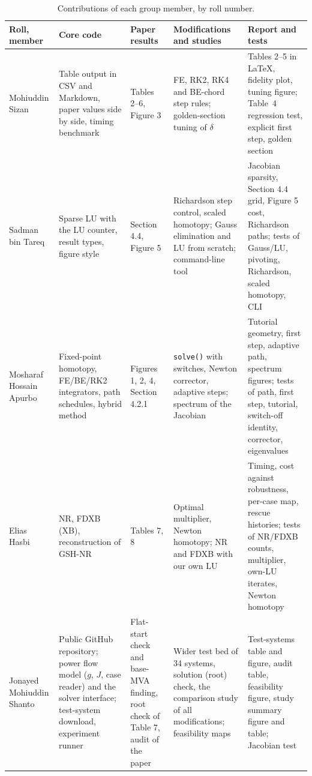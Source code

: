 \documentclass[sigconf,nonacm]{acmart}
\newcommand{\thead}[1]{\textbf{#1}}
\newcommand{\code}[1]{\texttt{#1}}
\begin{document}
\begin{table}[!htbp]
\centering
\caption{Contributions of each group member, by roll number.}
\label{tab:contrib}
\footnotesize
\begin{tabularx}{\textwidth}{@{}>{\raggedright\arraybackslash}p{2.6cm} >{\raggedright\arraybackslash}X >{\raggedright\arraybackslash}X >{\raggedright\arraybackslash}X >{\raggedright\arraybackslash}X@{}}
\toprule
\thead{Roll, member} & \thead{Core code} & \thead{Paper results} & \thead{Modifications and studies} & \thead{Report and tests} \\
\midrule
2105039\newline Mohiuddin Sizan & Table output in CSV and Markdown, paper values side by side, timing benchmark & Tables 2--6, Figure 3 & FE, RK2, RK4 and BE-chord step rules; golden-section tuning of $\delta$ & Tables 2--5 in \LaTeX, fidelity plot, tuning figure; Table~4 regression test, explicit first step, golden section \\
2105040\newline Sadman bin Tareq & Sparse LU with the LU counter, result types, figure style & Section 4.4, Figure 5 & Richardson step control, scaled homotopy; Gauss elimination and LU from scratch; command-line tool & Jacobian sparsity, Section 4.4 grid, Figure 5 cost, Richardson paths; tests of Gauss/LU, pivoting, Richardson, scaled homotopy, CLI \\
2105057\newline Mosharaf Hossain Apurbo & Fixed-point homotopy, FE/BE/RK2 integrators, path schedules, hybrid method & Figures 1, 2, 4, Section 4.2.1 & \code{solve()} with switches, Newton corrector, adaptive steps; spectrum of the Jacobian & Tutorial geometry, first step, adaptive path, spectrum figures; tests of path, first step, tutorial, switch-off identity, corrector, eigenvalues \\
2105058\newline Elias Hasbi & NR, FDXB (XB), reconstruction of GSH-NR & Tables 7, 8 & Optimal multiplier, Newton homotopy; NR and FDXB with our own LU & Timing, cost against robustness, per-case map, rescue histories; tests of NR/FDXB counts, multiplier, own-LU iterates, Newton homotopy \\
2105060\newline Jonayed Mohiuddin Shanto & Public GitHub repository; power flow model ($g$, $J$, case reader) and the solver interface; test-system download, experiment runner & Flat-start check and base-MVA finding, root check of Table 7, audit of the paper & Wider test bed of 34 systems, solution (root) check, the comparison study of all modifications; feasibility maps & Test-systems table and figure, audit table, feasibility figure, study summary figure and table; Jacobian test \\
\bottomrule
\end{tabularx}
\end{table}
\end{document}
